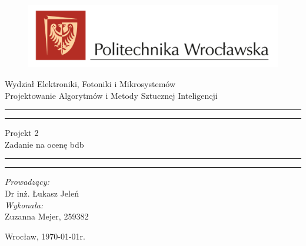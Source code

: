\begin{titlepage}
    \begin{figure}
        \centering
        \includegraphics[width=18cm]{logo-PWr.png}
        
        \label{fig:pwr}
    \end{figure}
        \begin{center}
            \huge Wydział Elektroniki, Fotoniki i Mikrosystemów \\ 
            \vspace{40pt}
            \huge Projektowanie Algorytmów i Metody Sztucznej Inteligencji  \\
        \end{center}
        \vspace{60pt}
        \hrule
        \vspace{1pt}
        \hrule
        \begin{center}
            {\fontsize{40}{50}\selectfont Projekt 2\\ }
            \vspace{10pt}
            {\fontsize{25}{25}\selectfont Zadanie na ocenę bdb }
        \end{center}
        \hrule
        \vspace{1pt}
        \hrule
        \begin{flushright}
            \vspace{65pt}
            \textit{\Large Prowadzący:}\\
            
            \Large Dr inż. Łukasz Jeleń\\
            \vspace{10pt}
            \textit{\Large Wykonała:}\\
            \Large Zuzanna Mejer, 259382 \\
        
        \end{flushright}
        \vspace{65pt}
        \begin{center}
            \large Wrocław, \today r.
        \end{center}
    \end{titlepage}